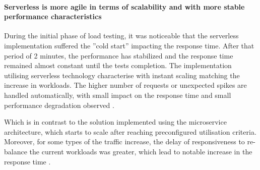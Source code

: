 
\paragraph{Serverless is more agile in terms of scalability and with more stable performance characteristics}

During the initial phase of load testing, it was noticeable that the serverless implementation suffered the ''cold start'' impacting the response time.
After that period of 2 minutes, the performance has stabilized and the response time remained almost constant until the tests completion.
The implementation utilising serverless technology characterise with instant scaling matching the increase in workloads.
The higher number of requests or unexpected spikes are handled automatically, with small impact on the response time and small performance degradation observed \cite{ServerlessComputingAnInvestigationOfDeploymentEnvironmentsForWebAPIs}.

Which is in contrast to the solution implemented using the microservice architecture, which starts to scale after reaching preconfigured utilisation criteria.
Moreover, for some types of the traffic increase, the delay of responsiveness to re-balance the current workloads was greater, which lead to notable increase in the response time \cite{MicroservicesvsServerlessAPerformanceComparisonOnCloudNativeWebApplication}.




